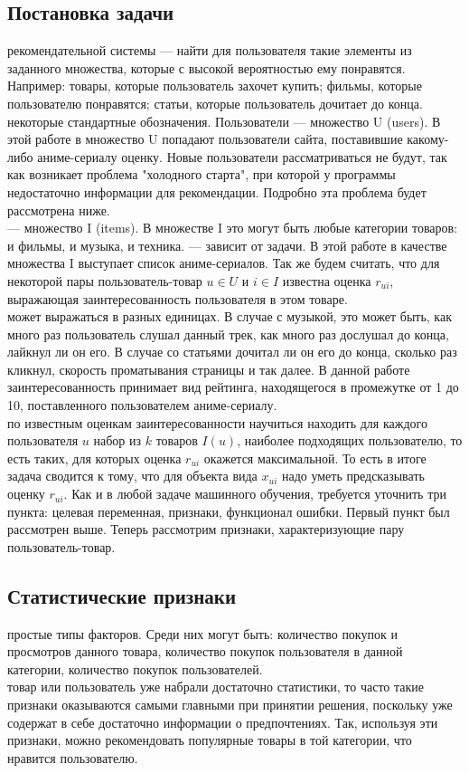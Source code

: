 \documentclass{article}
\newcommand\tab[1][1cm]{\hspace*{#1}}
\begin{document}
\subsection{Постановка задачи}
 рекомендательной системы — найти для пользователя такие элементы из заданного множества, которые с высокой вероятностью ему понравятся. Например: товары, которые пользователь захочет купить; фильмы, которые пользователю понравятся; статьи, которые пользователь дочитает до конца.\\
 некоторые стандартные обозначения. Пользователи — множество ﻿U (users). В этой работе в множество ﻿U попадают пользователи сайта, поставившие какому-либо аниме-сериалу оценку. Новые пользователи рассматриваться не будут, так как возникает проблема "холодного старта", при которой у программы недостаточно информации для рекомендации. Подробно эта проблема будет рассмотрена ниже.\\
 — множество ﻿I﻿ (items). В множестве I это могут быть любые категории товаров: и фильмы, и музыка, и техника. — зависит от задачи. В этой работе в качестве множества I выступает список аниме-сериалов. Так же будем считать, что для некоторой пары пользователь-товар ﻿$u\in U$ и $i\in I$﻿﻿ известна оценка $r_{ui}$, выражающая заинтересованность пользователя в этом товаре.\\
 может выражаться в разных единицах. В случае с музыкой, это может быть, как много раз пользователь слушал данный трек, как много раз дослушал до конца, лайкнул ли он его. В случае со статьями дочитал ли он его до конца, сколько раз кликнул, скорость проматывания страницы и так далее. В данной работе заинтересованность принимает вид рейтинга, находящегося в промежутке от 1 до 10, поставленного пользователем аниме-сериалу. \\
 по известным оценкам заинтересованности научиться находить для каждого пользователя $u$ набор из ﻿$k$ товаров ﻿$I(u)$, наиболее подходящих пользователю, то есть таких, для которых оценка ﻿$r_{ui}$ окажется максимальной. То есть в итоге задача сводится к тому, что для объекта вида ﻿$x_{ui}$ надо уметь предсказывать оценку $r_{ui}$. Как и в любой задаче машинного обучения, требуется уточнить три пункта: целевая переменная, признаки, функционал ошибки. Первый пункт был рассмотрен выше. Теперь рассмотрим признаки, характеризующие пару пользователь-товар.

\newpage
\subsection{Статистические признаки}
 простые типы факторов. Среди них могут быть: количество покупок и просмотров данного товара, количество покупок пользователя в данной категории, количество покупок пользователей.\\
 товар или пользователь уже набрали достаточно статистики, то часто такие признаки оказываются самыми главными при принятии решения, поскольку уже содержат в себе достаточно информации о предпочтениях. Так, используя эти признаки, можно рекомендовать популярные товары в той категории, что нравится пользователю.
\end{document}
